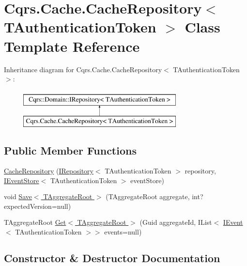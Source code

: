 \hypertarget{classCqrs_1_1Cache_1_1CacheRepository}{}\section{Cqrs.\+Cache.\+Cache\+Repository$<$ T\+Authentication\+Token $>$ Class Template Reference}
\label{classCqrs_1_1Cache_1_1CacheRepository}
Inheritance diagram for Cqrs.\+Cache.\+Cache\+Repository$<$ T\+Authentication\+Token $>$\+:\begin{figure}[H]
\begin{center}
\leavevmode
\includegraphics[height=2.000000cm]{classCqrs_1_1Cache_1_1CacheRepository}
\end{center}
\end{figure}
\subsection*{Public Member Functions}
\begin{DoxyCompactItemize}
\item 
\hyperlink{classCqrs_1_1Cache_1_1CacheRepository_a7cd3eccc63ac51da81449e4beebd289c}{Cache\+Repository} (\hyperlink{interfaceCqrs_1_1Domain_1_1IRepository}{I\+Repository}$<$ T\+Authentication\+Token $>$ repository, \hyperlink{interfaceCqrs_1_1Events_1_1IEventStore}{I\+Event\+Store}$<$ T\+Authentication\+Token $>$ event\+Store)
\item 
void \hyperlink{classCqrs_1_1Cache_1_1CacheRepository_a1c4bbe08b2a21523a4871d9a2f484ee6}{Save$<$ T\+Aggregate\+Root $>$} (T\+Aggregate\+Root aggregate, int? expected\+Version=null)
\item 
T\+Aggregate\+Root \hyperlink{classCqrs_1_1Cache_1_1CacheRepository_ab0e3de3ba5dcfab8827fed714a8b8944}{Get$<$ T\+Aggregate\+Root $>$} (Guid aggregate\+Id, I\+List$<$ \hyperlink{interfaceCqrs_1_1Events_1_1IEvent}{I\+Event}$<$ T\+Authentication\+Token $>$$>$ events=null)
\end{DoxyCompactItemize}


\subsection{Constructor \& Destructor Documentation}
\mbox{\label{classCqrs_1_1Cache_1_1CacheRepository_a7cd3eccc63ac51da81449e4beebd289c}} 
